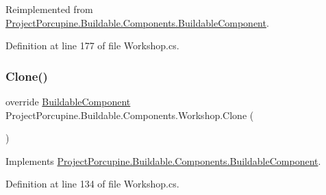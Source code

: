 Reimplemented from \hyperlink{class_project_porcupine_1_1_buildable_1_1_components_1_1_buildable_component_a589203e44ce8de22262caead43ad38d6}{Project\+Porcupine.\+Buildable.\+Components.\+Buildable\+Component}.



Definition at line 177 of file Workshop.\+cs.

\mbox{\label{class_project_porcupine_1_1_buildable_1_1_components_1_1_workshop_a902289f6ee9c0f227e093af73a477009}} 
\subsubsection{\texorpdfstring{Clone()}{Clone()}}
{\footnotesize\ttfamily override \hyperlink{class_project_porcupine_1_1_buildable_1_1_components_1_1_buildable_component}{Buildable\+Component} Project\+Porcupine.\+Buildable.\+Components.\+Workshop.\+Clone (\begin{DoxyParamCaption}{ }\end{DoxyParamCaption})\hspace{0.3cm}{\ttfamily [virtual]}}



Implements \hyperlink{class_project_porcupine_1_1_buildable_1_1_components_1_1_buildable_component_acfe1aedeaf167118ca5d0d2b046e00fb}{Project\+Porcupine.\+Buildable.\+Components.\+Buildable\+Component}.



Definition at line 134 of file Workshop.\+cs.

\mbox{\label{class_project_porcupine_1_1_buildable_1_1_components_1_1_workshop_adaf70643c87224e88a4efe3cc45ec288}} 
